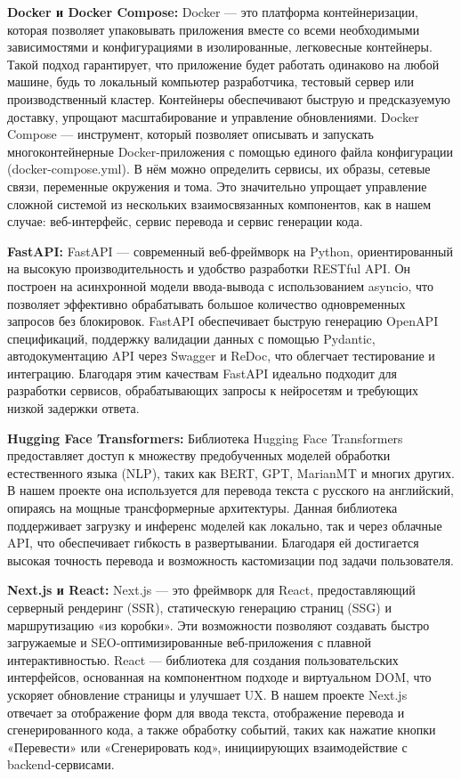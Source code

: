\textbf{Docker и Docker Compose:}  
Docker — это платформа контейнеризации, которая позволяет упаковывать приложения вместе со всеми необходимыми зависимостями и конфигурациями в изолированные, легковесные контейнеры. Такой подход гарантирует, что приложение будет работать одинаково на любой машине, будь то локальный компьютер разработчика, тестовый сервер или производственный кластер. Контейнеры обеспечивают быструю и предсказуемую доставку, упрощают масштабирование и управление обновлениями.\cite{docker2025docs}
Docker Compose — инструмент, который позволяет описывать и запускать многоконтейнерные Docker-приложения с помощью единого файла конфигурации (docker-compose.yml). В нём можно определить сервисы, их образы, сетевые связи, переменные окружения и тома. Это значительно упрощает управление сложной системой из нескольких взаимосвязанных компонентов, как в нашем случае: веб-интерфейс, сервис перевода и сервис генерации кода.

\textbf{FastAPI:}  
FastAPI — современный веб-фреймворк на Python, ориентированный на высокую производительность и удобство разработки RESTful API. Он построен на асинхронной модели ввода-вывода с использованием asyncio, что позволяет эффективно обрабатывать большое количество одновременных запросов без блокировок. \cite{fastapi2025docs}
FastAPI обеспечивает быструю генерацию OpenAPI спецификаций, поддержку валидации данных с помощью Pydantic, автодокументацию API через Swagger и ReDoc, что облегчает тестирование и интеграцию. Благодаря этим качествам FastAPI идеально подходит для разработки сервисов, обрабатывающих запросы к нейросетям и требующих низкой задержки ответа.

\textbf{Hugging Face Transformers:}  
Библиотека Hugging Face Transformers предоставляет доступ к множеству предобученных моделей обработки естественного языка (NLP), таких как BERT, GPT, MarianMT и многих других. В нашем проекте она используется для перевода текста с русского на английский, опираясь на мощные трансформерные архитектуры.  
Данная библиотека поддерживает загрузку и инференс моделей как локально, так и через облачные API, что обеспечивает гибкость в развертывании. Благодаря ей достигается высокая точность перевода и возможность кастомизации под задачи пользователя.

\textbf{Next.js и React:}  
Next.js — это фреймворк для React, предоставляющий серверный рендеринг (SSR), статическую генерацию страниц (SSG) и маршрутизацию «из коробки». Эти возможности позволяют создавать быстро загружаемые и SEO-оптимизированные веб-приложения с плавной интерактивностью. \cite{nextjs2025docs}
React — библиотека для создания пользовательских интерфейсов, основанная на компонентном подходе и виртуальном DOM, что ускоряет обновление страницы и улучшает UX. \cite{react2025docs}
В нашем проекте Next.js отвечает за отображение форм для ввода текста, отображение перевода и сгенерированного кода, а также обработку событий, таких как нажатие кнопки «Перевести» или «Сгенерировать код», инициирующих взаимодействие с backend-сервисами.

